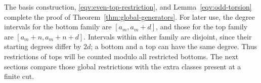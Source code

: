 The basis construction, \eqref{eqv:even-top-restriction}, and
Lemma~\ref{eqv:odd-torsion} complete the proof of
Theorem~\ref{thm:global-generators}.
For later use, the degree intervals for the bottom family are
\([a_m,a_m+d]\), and those for the top family are
\([a_m+n,a_m+n+d]\).
Intervals within either family are disjoint, since their starting
degrees differ by \(2d\); a bottom and a top can have the same degree.
Thus restrictions of tops will be counted modulo all restricted
bottoms.
The next sections compare those global restrictions with the extra
classes present at a finite cut.

